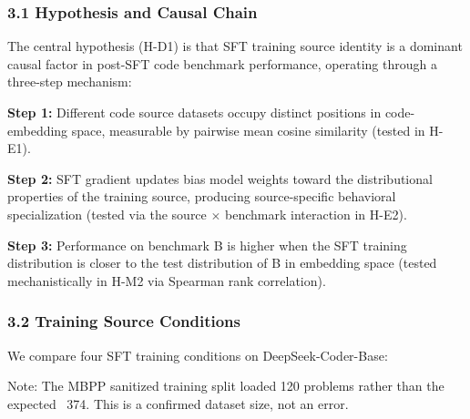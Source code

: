 
\subsubsection{3.1 Hypothesis and Causal Chain}

The central hypothesis (H-D1) is that SFT training source identity is a dominant causal factor in post-SFT code benchmark performance, operating through a three-step mechanism:

\textbf{Step 1:} Different code source datasets occupy distinct positions in code-embedding space, measurable by pairwise mean cosine similarity (tested in H-E1).

\textbf{Step 2:} SFT gradient updates bias model weights toward the distributional properties of the training source, producing source-specific behavioral specialization (tested via the source $\times$ benchmark interaction in H-E2).

\textbf{Step 3:} Performance on benchmark B is higher when the SFT training distribution is closer to the test distribution of B in embedding space (tested mechanistically in H-M2 via Spearman rank correlation).

\subsubsection{3.2 Training Source Conditions}

We compare four SFT training conditions on DeepSeek-Coder-Base:

\begin{table}[htbp]
\centering
{}
\end{table}

Note: The MBPP sanitized training split loaded 120 problems rather than the expected ~374. This is a confirmed dataset size, not an error.

